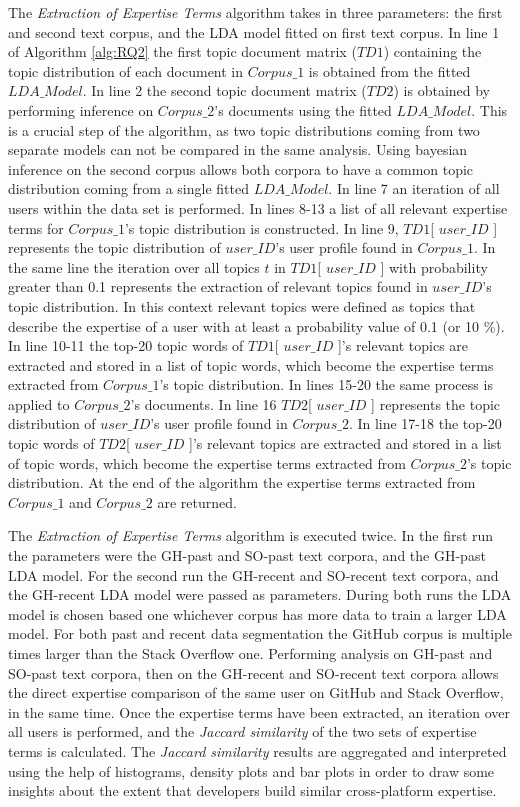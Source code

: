         The \emph{Extraction of Expertise Terms} algorithm takes in three parameters: the first and second text corpus, and the LDA model fitted on first text corpus. In line 1 of Algorithm \ref{alg:RQ2} the first topic document matrix ($TD1$) containing the topic distribution of each document in $Corpus\_1$ is obtained from the fitted $LDA\_Model$. In line 2 the second topic document matrix ($TD2$) is obtained by performing inference on $Corpus\_2$'s documents using the fitted $LDA\_Model$. This is a crucial step of the algorithm, as two topic distributions coming from two separate models can not be compared in the same analysis. Using bayesian inference on the second corpus allows both corpora to have a common topic distribution coming from a single fitted $LDA\_Model$. In line 7 an iteration of all users within the data set is performed. In lines 8-13 a list of all relevant expertise terms for $Corpus\_1$'s topic distribution is constructed. In line 9,  $TD1$[ $user\_ID$ ] represents the topic distribution of $user\_ID$'s user profile found in $Corpus\_1$. In the same line the iteration over all topics $t$ in $TD1$[ $user\_ID$ ] with probability greater than 0.1 represents the extraction of relevant topics found in $user\_ID$'s topic distribution. In this context relevant topics were defined as topics that describe the expertise of a user with at least a probability value of 0.1 (or 10 \%). In line 10-11 the top-20 topic words of $TD1$[ $user\_ID$ ]'s relevant topics are extracted and stored in a list of topic words, which become the expertise terms extracted from $Corpus\_1$'s topic distribution. In lines 15-20 the same process is applied to $Corpus\_2$'s documents. In line 16  $TD2$[ $user\_ID$ ] represents the topic distribution of $user\_ID$'s user profile found in $Corpus\_2$. In line 17-18 the top-20 topic words of $TD2$[ $user\_ID$ ]'s relevant topics are extracted and stored in a list of topic words, which become the expertise terms extracted from $Corpus\_2$'s topic distribution. At the end of the algorithm the expertise terms extracted from $Corpus\_1$ and $Corpus\_2$ are returned.
        
        The \emph{Extraction of Expertise Terms} algorithm is executed twice. In the first run the parameters were the GH-past and SO-past text corpora, and the GH-past LDA model. For the second run the GH-recent and SO-recent text corpora, and the GH-recent LDA model were passed as parameters. During both runs the LDA model is chosen based one whichever corpus has more data to train a larger LDA model. For both past and recent data segmentation the GitHub corpus is multiple times larger than the Stack Overflow one. Performing analysis on GH-past and SO-past text corpora, then on the GH-recent and SO-recent text corpora allows the direct expertise comparison of the same user on GitHub and Stack Overflow, in the same time. Once the expertise terms have been extracted, an iteration over all users is performed, and the \emph{Jaccard similarity} of the two sets of expertise terms is calculated. The \emph{Jaccard similarity} results are aggregated and interpreted using the help of histograms, density plots and bar plots in order to draw some insights about the extent that developers build similar cross-platform expertise.
    
